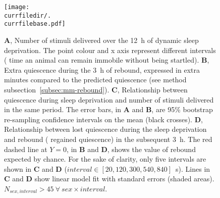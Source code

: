 \begin{figure}[h!]
	\centering   
	\texttt{[image: \\currfiledir/.\\currfilebase.pdf]}
	  \caption[Only a few  targeted stimuli causes a homeostatic rebound]{
	\textbf{A}, Number of stimuli delivered over the 12~h of dynamic sleep deprivation. The point colour and x axis represent different intervals (\ie{} time an animal can remain immobile without being startled).
	\textbf{B}, Extra quiescence during the 3~h of rebound, expressed in extra minutes compared to the predicted quiescence (see method subsection~\ref{subsec:mm-rebound}).
	\textbf{C}, Relationship between quiescence during sleep deprivation and number of stimuli delivered in the same period.
	The error bars, in \textbf{A} and \textbf{B}, are 95\% bootstrap re-sampling confidence intervals on the mean (black crosses).
	\textbf{D}, Relationship between lost quiescence during the sleep deprivation and rebound (\ie{} regained quiescence) in the subsequent 3~h.
	The red dashed line at $Y=0$, in \textbf{B} and \textbf{D}, shows the value of rebound expected by chance.
	For the sake of clarity, only five intervals are shown in \textbf{C} and \textbf{D} ($interval \in [20,120,300,540,840]$~s).
	Lines in \textbf{C} and \textbf{D} show linear model fit with standard errors (shaded areas).
	$N_{sex,interval} > 45~\forall~sex \times interval$.
	\label{fig:\currfilebase}
}
\end{figure}

